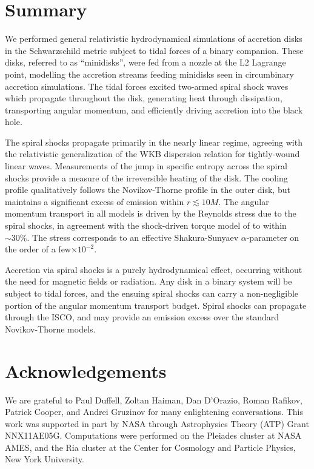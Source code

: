 \documentclass{emulateapj}
\newcommand{\al}{\alpha}
\begin{document}

\section{Summary}
\label{sec:summary}


We performed general relativistic hydrodynamical simulations of accretion disks in the Schwarzschild metric subject to tidal forces of a binary companion.  These disks, referred to as ``minidisks'', were fed from a nozzle at the L2 Lagrange point, modelling the accretion streams feeding minidisks seen in circumbinary accretion simulations.  The tidal forces excited two-armed spiral shock waves which propagate throughout the disk,  generating heat through dissipation, transporting angular momentum, and efficiently driving accretion into the black hole.

The spiral shocks propagate primarily in the nearly linear regime, agreeing with the relativistic generalization of the WKB dispersion relation for tightly-wound linear waves.  Measurements of the jump in specific entropy across the spiral shocks provide a measure of the irreversible heating of the disk.  The cooling profile qualitatively follows the Novikov-Thorne profile in the outer disk, but maintains a significant excess of emission within $r \lesssim 10 M$.  The angular momentum transport in all models is driven by the Reynolds stress due to the spiral shocks, in agreement with the shock-driven torque model of \citep{Rafikov16} to within $\sim30\%$.  The stress corresponds to an effective Shakura-Sunyaev $\al$-parameter on the order of a few$\times 10^{-2}$.

Accretion via spiral shocks is a purely hydrodynamical effect, occurring without the need for magnetic fields or radiation.  Any disk in a binary system will be subject to tidal forces, and the ensuing spiral shocks can carry a non-negligible portion of the angular momentum transport budget.  Spiral shocks can propagate through the ISCO, and may provide an emission excess over the standard Novikov-Thorne models.



\section{Acknowledgements}
We are grateful to Paul Duffell, Zoltan Haiman, Dan D'Orazio, Roman Rafikov, Patrick Cooper, and Andrei Gruzinov for many enlightening conversations.  This work was supported in part by NASA through Astrophysics Theory (ATP) Grant NNX11AE05G.  Computations were performed on the Pleiades cluster at NASA AMES, and the Ria cluster at the Center for Cosmology and Particle Physics, New York University.





%
\end{document}
